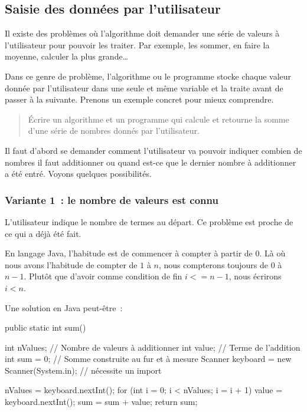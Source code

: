 \subsection{Saisie des données par l'utilisateur}

	Il existe des problèmes où l’algorithme doit demander une série de valeurs
	à l’utilisateur pour pouvoir les traiter.  Par exemple, les sommer, en faire
	la moyenne, calculer la plus grande\dots
	
	Dans ce genre de problème, l'algorithme ou le programme stocke chaque valeur
	donnée par l’utilisateur dans une seule et même variable et la traite avant
	de passer à la suivante.  Prenons un exemple concret pour mieux comprendre.

	\begin{quote}
	Écrire un algorithme et un programme qui calcule et retourne 
	la somme d’une série de nombres donnés par l’utilisateur. 
	\end{quote}

	Il faut d’abord se demander comment l’utilisateur va pouvoir indiquer
	combien de nombres il faut additionner ou quand est-ce que le dernier nombre
	à additionner a été entré.  Voyons quelques possibilités.
	

	\subsubsection{Variante 1~: le nombre de valeurs est connu} 
	
		L’utilisateur indique le nombre de termes au départ.
		Ce problème est proche de ce qui a déjà été fait.
		
		En langage Java, l'habitude est de commencer à compter à partir de 0.
		Là où nous avons l'habitude de compter de $1$ à $n$, nous compterons
		toujours de $0$ à $n-1$. Plutôt que d'avoir comme condition de fin $i
		<= n - 1$, nous écrirons $i < n$.

		Une solution en Java peut-être~:

		\begin{java}
public static int sum(){
	int nValues;		// Nombre de valeurs à additionner
	int value;			// Terme de l'addition
	int sum = 0;		// Somme construite au fur et à mesure
	Scanner keyboard = new Scanner(System.in); // nécessite un import
	
	nValues = keyboard.nextInt();
	for (int i = 0; i < nValues; i = i + 1){
		value = keyboard.nextInt();
		sum = sum + value;
	}
	return sum;
}
		\end{java}


